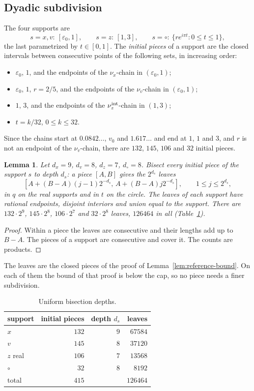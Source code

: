\documentclass{amsart}
\newtheorem{lemma}{Lemma}[section]
\numberwithin{equation}{section}
\numberwithin{table}{section}
\newcommand{\Narcs}{32}
\newcommand{\nleaves}{126464}
\begin{document}
\subsection{Dyadic subdivision}\label{app:depths}
The four supports are
\[
 s=x,v:\ [\varepsilon_0,1],\qquad s=z:\ [1,3],\qquad
 s=\circ:\ \{re^{i\pi t}:0\le t\le1\},
\]
the last parametrized by $t\in[0,1]$. The \emph{initial pieces} of a support
are the closed intervals between consecutive points of the following sets,
in increasing order:
\begin{itemize}
\item[$x$:] $\varepsilon_0$, $1$, and the endpoints of the $\nu_x$-chain in
$(\varepsilon_0,1)$;
\item[$v$:] $\varepsilon_0$, $1$, $r=2/5$, and the endpoints of the
$\nu_v$-chain in $(\varepsilon_0,1)$;
\item[$z$:] $1$, $3$, and the endpoints of the $\nu_z^{\rm int}$-chain in $(1,3)$;
\item[$\circ$:] $t=k/\Narcs$, $0\le k\le\Narcs$.
\end{itemize}
Since the chains start at $0.0842\ldots$, $v_0$ and $1.617\ldots$ and end at
$1$, $1$ and $3$, and $r$ is not an endpoint of the $\nu_v$-chain, there are
$132$, $145$, $106$ and $\Narcs$ initial pieces.

\begin{lemma}\label{lem:leaves}
Let $d_x=9$, $d_v=8$, $d_z=7$, $d_\circ=8$. Bisect every initial piece of the
support $s$ to depth $d_s$: a piece $[A,B]$ gives the $2^{d_s}$ leaves
\[
 [A+(B-A)(j-1)2^{-d_s},\,A+(B-A)j2^{-d_s}],\qquad 1\le j\le2^{d_s},
\]
in $q$ on the real supports and in $t$ on the circle. The leaves of each
support have rational endpoints, disjoint interiors and union equal to the
support. There are $132\cdot2^9$, $145\cdot2^8$, $106\cdot2^7$ and
$\Narcs\cdot2^8$ leaves, $\nleaves$ in all (Table~\ref{tab:depths}).
\end{lemma}

\begin{proof}
Within a piece the leaves are consecutive and their lengths add up to
$B-A$. The pieces of a support are consecutive and cover it. The counts are
products.
\end{proof}

The leaves are the closed pieces of the proof of
Lemma~\ref{lem:reference-bound}. On each of them the bound of that proof is
below the cap, so no piece needs a finer subdivision.

\begin{table}[!ht]
\centering\small\renewcommand{\arraystretch}{1.14}
\caption{Uniform bisection depths.}\label{tab:depths}
\begin{tabular}{@{}lrrr@{}}
\hline
support&initial pieces&depth $d_s$&leaves\\
\hline
$x$ & $132$ & $9$ & $67584$\\
$v$ & $145$ & $8$ & $37120$\\
$z$ real & $106$ & $7$ & $13568$\\
$\circ$ & $32$ & $8$ & $8192$\\
total & $415$ & & $126464$\\
\hline
\end{tabular}
\end{table}
\end{document}
